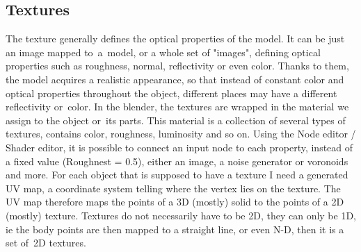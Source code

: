 \documentclass[12pt,a4paper,titlepage,final,tikz,border=4mm]{report}
\begin{document}
\subsection{Textures}
The texture generally defines the optical properties of the model. It can be just an image mapped to~a~model, or a whole set of "images", defining optical properties such as roughness, normal, reflectivity or even color. Thanks to them, the model acquires a realistic appearance, so that instead of constant color and optical properties throughout the object, different places may have a different reflectivity or~color. In the blender, the textures are wrapped in the material we assign to the object or~its parts. This material is a collection of several types of textures, contains color, roughness, luminosity and so on. Using the Node editor / Shader editor, it is possible to connect an input node to each property, instead of a fixed value (Roughnest = 0.5), either an image, a noise generator or voronoids and more. For each object that is supposed to have a texture I need a generated UV map, a coordinate system telling where the vertex lies on the texture. The UV map therefore maps the points of a 3D (mostly) solid to the points of a 2D (mostly) texture. Textures do not necessarily have to be 2D, they can only be 1D, ie the body points are then mapped to a straight line, or even N-D, then it is a set of~2D textures.
\end{document}
